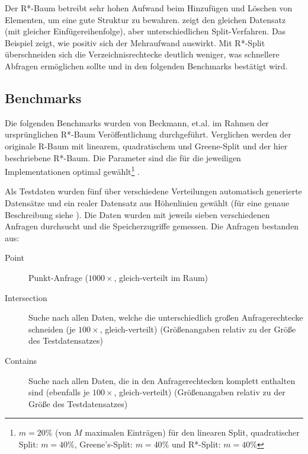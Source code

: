 \documentclass[runningheads,a4paper]{llncs}
\begin{document}
	Der R*-Baum betreibt sehr hohen Aufwand beim Hinzufügen und Löschen von Elementen, um eine gute Struktur zu bewahren.  zeigt den gleichen Datensatz (mit gleicher Einfügereihenfolge), aber unterschiedlichen Split-Verfahren. Das Beispiel zeigt, wie positiv sich der Mehraufwand auswirkt. Mit R*-Split überschneiden sich die Verzeichnisrechtecke deutlich weniger, was schnellere Abfragen ermöglichen sollte und in den folgenden Benchmarks bestätigt wird.

	\subsection{Benchmarks} %
	\label{sub:benchmarks}

	Die folgenden Benchmarks wurden von Beckmann, et.al. im Rahmen der ursprünglichen R*-Baum Veröffentlichung durchgeführt. Verglichen werden der originale R-Baum mit linearem, quadratischem und Greene-Split und der hier beschriebene R*-Baum. Die Parameter sind die für die jeweiligen Implementationen optimal gewählt\footnote{$m=20\%$ (von $M$ maximalen Einträgen) für den linearen Split, quadratischer Split: $m=40\%$, Greene's-Split: $m=40\%$ und R*-Split: $m=40\%$} \citep[vgl.][328]{Beckmann:1990}.

	Als Testdaten wurden fünf über verschiedene Verteilungen automatisch generierte Datensätze und ein realer Datensatz aus Höhenlinien gewählt (für eine genaue Beschreibung siehe \cite[328]{Beckmann:1990}). Die Daten wurden mit jeweils sieben verschiedenen Anfragen durchsucht und die Speicherzugriffe gemessen. Die Anfragen bestanden aus:
	\begin{description}
		\item[Point] Punkt-Anfrage ($1000\times$, gleich-verteilt im Raum)
		\item[Intersection] Suche nach allen Daten, welche die unterschiedlich großen Anfragerechtecke schneiden (je $100\times$, gleich-verteilt) (Größenangaben relativ zu der Größe des Testdatensatzes)
		\item[Contains] Suche nach allen Daten, die in den Anfragerechtecken komplett enthalten sind (ebenfalls je $100\times$, gleich-verteilt) (Größenangaben relativ zu der Größe des Testdatensatzes)
	\end{description}
\end{document}
